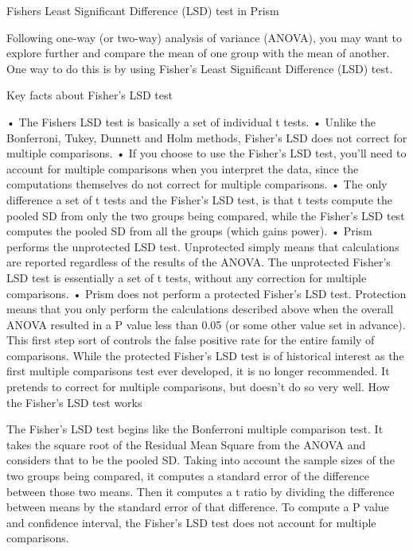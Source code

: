 Fishers Least Significant Difference (LSD) test in Prism

Following one-way (or two-way) analysis of variance (ANOVA), you may want to explore further and compare the mean of one group with the mean of another. One way to do this is by using  Fisher's Least Significant Difference (LSD) test.

Key facts about Fisher's LSD test

•	The Fishers LSD test is basically a set of individual t tests.
•	Unlike the Bonferroni, Tukey, Dunnett and Holm methods, Fisher's LSD does not correct for multiple comparisons.
•	If you choose to use the Fisher's LSD test, you'll need to account for multiple comparisons when you interpret the data, since the computations themselves do not correct for multiple comparisons.
•	The only difference a set of t tests and the Fisher's LSD test, is that t tests compute the pooled SD from only the two groups being compared, while the Fisher's LSD test computes the pooled SD from all the groups (which gains power).
•	Prism performs the unprotected LSD test. Unprotected simply means that calculations are reported regardless of the results of the  ANOVA. The unprotected Fisher's LSD test is essentially a set of t tests, without any correction for multiple comparisons.
•	Prism does not perform a protected Fisher's LSD test. Protection means that you only perform the calculations described above when the overall ANOVA resulted in a P value less than 0.05 (or some other value set in advance). This first step sort of controls the false positive rate for the entire family of comparisons. While the protected Fisher's LSD test is of historical interest as the first multiple comparisons test ever developed, it is no longer recommended. It pretends to correct for multiple comparisons, but doesn't do so very well.
How the Fisher's LSD test works

The Fisher's LSD test begins like the Bonferroni multiple comparison test. It takes the square root of the Residual Mean Square from the ANOVA and considers that to be the pooled SD. Taking into account the sample sizes of the two groups being compared, it computes a standard error of the difference between those two means. Then it computes a t ratio by dividing the difference between means by the standard error of that difference. To compute a P value and confidence interval, the Fisher's LSD test does not account for multiple comparisons.
